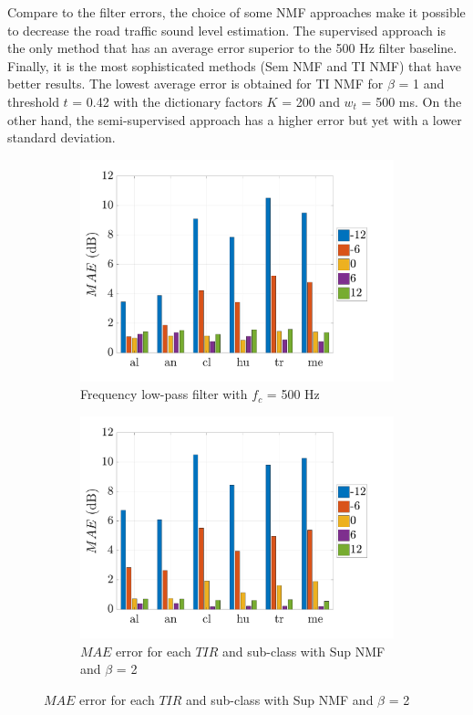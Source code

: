 \documentclass[twocolumn,a4paper,10pt]{article}
\begin{document}
Compare to the filter errors, the choice of some NMF approaches make it possible to decrease the road traffic sound level estimation. The supervised approach is the only method that has an average error superior to the 500 Hz filter baseline. Finally, it is the most sophisticated methods (Sem NMF and TI NMF) that have better results. The lowest average error is obtained for TI NMF for $\beta$ = 1 and threshold $t$ = 0.42 with the dictionary factors $K$ = 200 and $w_t$ = 500 ms. On the other hand, the semi-supervised approach has a higher error but yet with a lower standard deviation.

\begin{figure}[t]
    \centering
    \begin{subfigure}[t]{0.45\textwidth}
        \centering
        \includegraphics[width=\linewidth]{figures/filter_bar.pdf}
        \caption{Frequency low-pass filter with $f_c$ = 500 Hz}
        \label{fig:TIR_class_filter}
    \end{subfigure}%
    \hfill
    \begin{subfigure}[t]{0.45\textwidth}
        \centering
        \includegraphics[width=\linewidth]{figures/sup_bar.pdf}
        \caption{$MAE$ error for each $TIR$ and sub-class with Sup NMF and $\beta$ = 2}
                \label{fig:TIR_class_sup}
    \end{subfigure}


\end{figure}
\end{document}
